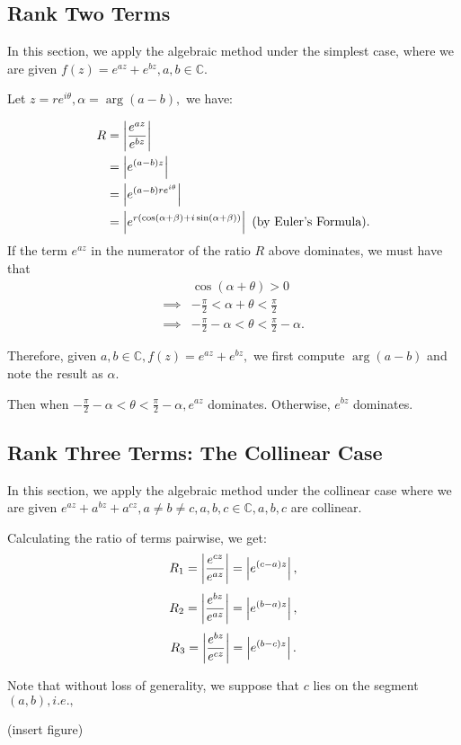 \documentclass[11pt,reqno,oneside,a4paper]{article}
\begin{document}
\subsection{Rank Two Terms}
In this section, we apply the algebraic method under the simplest case, where we are given $f(z) = e^{az} + e^{bz}, a,b\in \mathbb{C}.$ 

Let $z = re^{i\theta}, \alpha = \arg(a-b),$ we have:

\begin{align*}
R &= \left\lvert\frac{e^{az}}{e^{bz}}\right\rvert\\
  &= \left\lvert e^{(a-b)z}\right\rvert\\
  &= \left\lvert e^{(a-b)re^{i\theta}}\right\rvert\\
  &= \left\lvert e^{r(\cos(\alpha + \beta)+ i \sin(\alpha + \beta))}\right\rvert \text{ (by Euler's Formula)}.
\end{align*}
If the term $e^{az}$ in the numerator of the ratio $R$ above dominates, we must have that 
\begin{align*}
	&\cos(\alpha + \theta) > 0\\
	\implies& -\frac{\pi}{2} < \alpha + \theta < \frac{\pi}{2}\\
	\implies& -\frac{\pi}{2} - \alpha < \theta < \frac{\pi}{2} - \alpha.
\end{align*}

Therefore, given $a,b\in\mathbb{C}, f(z) = e^{az} + e^{bz},$ we first compute $\arg(a-b)$ and note the result as $\alpha.$ 

Then when $-\frac{\pi}{2} - \alpha < \theta < \frac{\pi}{2} - \alpha, e^{az}$ dominates. Otherwise, $e^{bz}$ dominates. 

\subsection{Rank Three Terms: The Collinear Case}\label{subsec:algcol}

In this section, we apply the algebraic method under the collinear case where we are given $e^{az}+a^{bz} + a^{cz}, a\neq b \neq c, a,b,c \in \mathbb{C}, a,b,c$ are collinear. 

Calculating the ratio of terms pairwise, we get:
$$R_1 = \left\lvert\frac{e^{cz}}{e^{az}}\right\rvert = \left\lvert e^{(c-a)z}\right\rvert,$$
$$R_2 = \left\lvert\frac{e^{bz}}{e^{az}}\right\rvert = \left\lvert e^{(b-a)z}\right\rvert,$$
$$R_3 = \left\lvert\frac{e^{bz}}{e^{cz}}\right\rvert = \left\lvert e^{(b-c)z}\right\rvert.$$

Note that without loss of generality, we suppose that $c$ lies on the segment $(a,b), i.e.,$

(insert figure)
\end{document}
